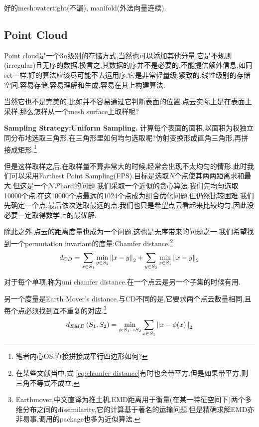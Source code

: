 	
	好的mesh:watertight(不漏), manifold(外法向量连续).
	
	\subsection{Point Cloud}
	
	Point cloud是一个$3n$级别的存储方式,当然也可以添加其他分量.它是不规则(irregular)且无序的数据.换言之,其数据的序并不是必要的,不能提供额外信息,如同set一样.好的算法应该尽可能不去运用序.它是非常轻量级,紧致的,线性级别的存储空间.容易存储,容易理解和生成,容易在其上构建算法.
	
	当然它也不是完美的,比如并不容易通过它判断表面的位置.点云实际上是在表面上采样,那么怎样从一个mesh surface上取样呢?
	
	\textbf{Sampling Strategy:Uniform Sampling.}
	计算每个表面的面积,以面积为权独立同分布地选取三角形.在三角形里如何均匀选取呢?仿射变换形成直角三角形,再拼接成矩形.\footnote{笔者内心OS:直接拼接成平行四边形如何?}
	
	但是这样取样之后,在取样量不算非常大的时候,经常会出现不太均匀的情形.此时我们可以采用Farthest Point Sampling(FPS).目标是选取$N$个点使其两两距离求和最大.但这是一个$\mathcal{NP}$hard的问题.我们采取一个近似的贪心算法.我们先均匀选取10000个点.在这10000个点最远的1024个点成为组合优化问题.但仍然比较困难.我们先确定一个点,最后依次选取最远的点.我们也只是希望点云看起来比较均匀,因此没必要一定取得数学上的最优解.
	
	除此之外,点云的距离度量也成为一个问题,这也是无序带来的问题之一.我们希望找到一个permutation invariant的度量:Chamfer distance.\footnote{在某些文献当中,式 \ref{eq:chamfer distance}有时也会带平方.但是如果带平方,则三角不等式不成立.}
	\begin{equation}
		d_{CD} = \sum_{x \in S_1} \min_{y \in S_2} \left \Vert x - y \right \Vert_{2} + \sum_{y \in S_2} \min_{x \in S_1} \left \Vert x - y \right \Vert_{2}
		\label{eq:chamfer distance}
	\end{equation}
	
	对于每个单项,称为uni chamfer distance.在一个点云是另一个子集的时候有用.
	
	另一个度量是Earth Mover's distance.与CD不同的是,它要求两个点云数量相同,且每个点必须找到互不重复的对应.\footnote{Earthmover,中文直译为推土机.EMD距离用于衡量(在某一特征空间下)两个多维分布之间的dissimilarity,它的计算基于著名的运输问题.但是精确求解EMD亦非易事,调用的package也多为近似算法.}
	\begin{equation}
		d_{E M D}\left(S_{1}, S_{2}\right)=\min _{\phi: S_{1} \rightarrow S_{2}} \sum_{x \in S_{1}} \left \Vert x-\phi(x) \right \Vert_{2}
	\end{equation}

